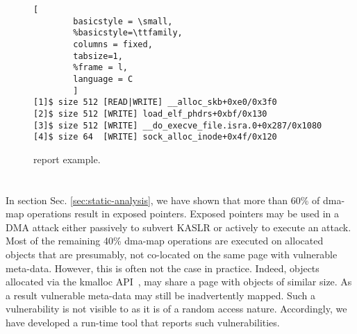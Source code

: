 \begin{figure}[t]
\begin{adjustbox}{width=\linewidth}
        \begin{lstlisting}[
        basicstyle = \small,
        %basicstyle=\ttfamily,
        columns = fixed,
        tabsize=1,
        %frame = l,
        language = C
        ]
[1]$ size 512 [READ|WRITE] __alloc_skb+0xe0/0x3f0
[2]$ size 512 [WRITE] load_elf_phdrs+0xbf/0x130
[3]$ size 512 [WRITE] __do_execve_file.isra.0+0x287/0x1080
[4]$ size 64  [WRITE] sock_alloc_inode+0x4f/0x120
        \end{lstlisting}
\end{adjustbox}
        \caption{\dkasan report example.}
        \label{fig:dkasan-report}
\end{figure}


\section{\dkasan}\label{sec:dma-kasan} 

In section Sec. \ref{sec:static-analysis}, we have shown that more than 60\% of dma-map operations result in exposed pointers. Exposed pointers may be used in a DMA attack either passively to subvert KASLR or actively to execute an attack. Most of the remaining 40\% dma-map operations are executed on allocated objects that are presumably, not co-located on the same page with vulnerable meta-data. However, this is often not the case in practice.
Indeed, objects allocated via the kmalloc API~\cite{Cor07}, may share a page with objects of similar size. As a result vulnerable meta-data may still be inadvertently mapped. 
%
Such a vulnerability is not visible to \tool as it is of a random access nature. Accordingly, we have developed a run-time tool that reports such vulnerabilities. 

